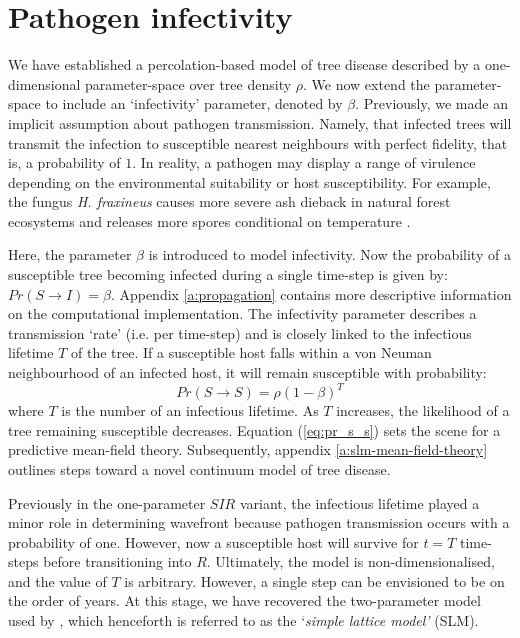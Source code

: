 \section{Pathogen infectivity}
\label{ch3:two-param-model}

We have established a percolation-based model of tree disease described by a one-dimensional parameter-space over tree density $\rho$. %
We now extend the parameter-space to include an `infectivity' parameter, denoted by $\beta$. %
Previously, we made an implicit assumption about pathogen transmission. Namely, that infected trees will transmit the infection to susceptible nearest neighbours with perfect fidelity, that is, a probability of $1$. 
In reality, a pathogen may display a range of virulence depending on the environmental suitability or host susceptibility. For example, the fungus \textit{H. fraxineus} causes more severe ash dieback in natural forest ecosystems \cite{marciulyniene2017can} and releases more spores conditional on temperature \cite{chandelier2014detection}.

Here, the parameter $\beta$ is introduced to model infectivity. Now the probability of a susceptible tree becoming infected during a single time-step is given by: $Pr(S \rightarrow I) = \beta$. Appendix \ref{a:propagation} contains more descriptive information on the computational implementation. 
The infectivity parameter describes a transmission `rate' (i.e. per time-step) and is closely linked to the infectious lifetime $T$ of the tree. %
If a susceptible host falls within a von Neuman neighbourhood of an infected host, it will remain susceptible with probability:
\begin{equation}
\label{eq:pr_s_s}
    Pr(S \rightarrow S) = \rho(1 -\beta)^T
\end{equation}
where $T$ is the number of an infectious lifetime. As $T$ increases, the likelihood of a tree remaining susceptible decreases.
Equation (\ref{eq:pr_s_s}) sets the scene for a predictive mean-field theory.
Subsequently, appendix \ref{a:slm-mean-field-theory} outlines steps toward a novel continuum model of tree disease.

Previously in the one-parameter $SIR$ variant, the infectious lifetime played a minor role in determining wavefront because pathogen transmission occurs with a probability of one.
However, now a susceptible host will survive for $t=T$ time-steps before transitioning into $R$. Ultimately, the model is non-dimensionalised, and the value of $T$ is arbitrary. However, a single step can be envisioned to be on the order of years. At this stage, we have recovered the two-parameter model used by \cite{OROZCOFUENTES201912}, which henceforth is referred to as the `\textit{simple lattice model'} (SLM). 

